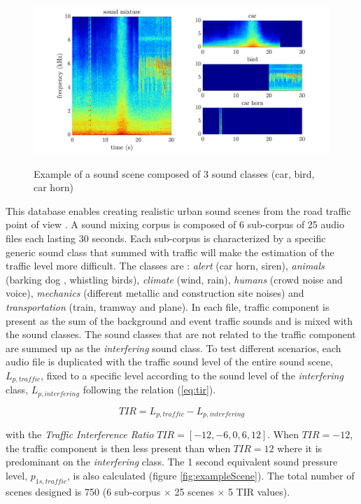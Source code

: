 \documentclass[twocolumn,a4paper,10pt]{article}
\begin{document}
\begin{figure}[t]
\centering
\includegraphics[width=\linewidth]{../image/exampleSimScene2.pdf}
\label{fig:exampleSimScene}
\caption{Example of a sound scene composed of 3 sound classes (car, bird, car horn)}
\end{figure}

This database enables creating realistic urban sound scenes from the road traffic point of view \cite{gloaguen_creation_2017}. A sound mixing corpus is composed of 6 sub-corpus of 25 audio files each lasting 30 seconds. Each sub-corpus is characterized by a specific generic sound class that summed with traffic will make the estimation of the traffic level more difficult. The classes are : \textit{alert} (car horn, siren), \textit{animals} (barking dog , whistling birds), \textit{climate} (wind, rain), \textit{humans} (crowd noise and voice), \textit{mechanics} (different metallic and construction site noises) and \textit{transportation} (train, tramway and plane). In each file, traffic component is present as the sum of the background and event traffic sounds and is mixed with the sound classes. The sound classes that are not related to the traffic component are summed up as the \textit{interfering} sound class. To test different scenarios, each audio file is duplicated with the traffic sound level of the entire sound scene, $L_{p,traffic}$, fixed to a specific level according to the sound level of the \textit{interfering} class, $L_{p,interfering}$ following the relation (\ref{eq:tir}).

\begin{equation}\label{eq:tir}
TIR = L_{p,traffic}-L_{p,interfering}
\end{equation}

with the \textit{Traffic Interference Ratio} $TIR = \left[-12, -6, 0, 6, 12\right]$. When $TIR = -12$, the traffic component is then less present than when $TIR = 12$ where it is predominant on the \textit{interfering} class. The 1 second equivalent sound pressure level, $p_{1s,traffic}$, is also calculated (figure \ref{fig:exampleScene}). The total number of scenes designed is 750 (6 sub-corpus $\times$ 25 scenes $\times$  5 TIR values).
\end{document}
